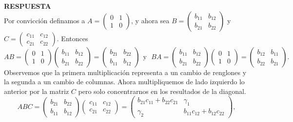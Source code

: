 \documentclass[11pt,letterpaper]{article}
\newcommand{\res}{\textbf{RESPUESTA}\\}
\begin{document}
\begin{enumerate}
\res
Por convicción definamos a $A=\left( \begin{array}{cc}
0&1 \\
1&0
\end{array} \right)$, y ahora sea $B=\left( \begin{array}{cc}
b_{11}&b_{12} \\
b_{21}&b_{22}
\end{array} \right)$ y $C=\left( \begin{array}{cc}
c_{11}&c_{12} \\
c_{21}&c_{22}
\end{array} \right)$. Entonces 
\begin{equation*}
AB=\left( \begin{array}{cc}
0&1 \\
1&0
\end{array} \right)\left( \begin{array}{cc}
b_{11}&b_{12} \\
b_{21}&b_{22}
\end{array} \right)=\left( \begin{array}{cc}
b_{21}&b_{22} \\
b_{11}&b_{12}
\end{array} \right)\ \  \text{y} \ \ \ BA=\left( \begin{array}{cc}
b_{11}&b_{12} \\
b_{21}&b_{22}
\end{array} \right)\left( \begin{array}{cc}
0&1 \\
1&0
\end{array} \right)=\left( \begin{array}{cc}
b_{12}&b_{11} \\
b_{22}&b_{21}
\end{array} \right).
\end{equation*}
Observemos que la primera multiplicación representa a un cambio de renglones y la segunda a un cambio de columnas. Ahora multipliquemos de lado izquierdo lo anterior por la matriz $C$ pero solo concentrarnos en los resultados de la diagonal. 
\begin{equation*}
ABC=\left( \begin{array}{cc}
b_{21}&b_{22} \\
b_{11}&b_{12}
\end{array} \right)\left( \begin{array}{cc}
c_{11}&c_{12} \\
c_{21}&c_{22}
\end{array} \right)=
\left( \begin{array}{cc}
b_{21}c_{11}+b_{22}c_{21} & \gamma_1\\
\gamma_2&b_{11}c_{12}+b_{12}c_{22}
\end{array} \right),
\end{equation*}


\end{enumerate}
\end{document}
